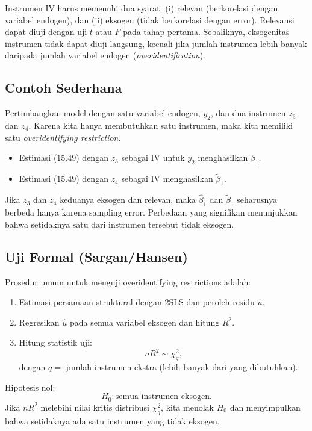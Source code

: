 \documentclass[]{article}
\begin{document}
Instrumen IV harus memenuhi dua syarat: (i) relevan (berkorelasi dengan variabel endogen), 
dan (ii) eksogen (tidak berkorelasi dengan error). Relevansi dapat diuji dengan uji $t$ atau $F$ 
pada tahap pertama. Sebaliknya, eksogenitas instrumen tidak dapat diuji langsung, 
kecuali jika jumlah instrumen lebih banyak daripada jumlah variabel endogen (\textit{overidentification}).

\subsection*{Contoh Sederhana}
Pertimbangkan model dengan satu variabel endogen, $y_2$, dan dua instrumen $z_3$ dan $z_4$.
Karena kita hanya membutuhkan satu instrumen, maka kita memiliki satu 
\textit{overidentifying restriction}. 

\begin{itemize}
    \item Estimasi (15.49) dengan $z_3$ sebagai IV untuk $y_2$ menghasilkan $\hat{\beta}_1$.
    \item Estimasi (15.49) dengan $z_4$ sebagai IV menghasilkan $\tilde{\beta}_1$.
\end{itemize}

Jika $z_3$ dan $z_4$ keduanya eksogen dan relevan, maka $\hat{\beta}_1$ dan $\tilde{\beta}_1$ 
seharusnya berbeda hanya karena sampling error. Perbedaan yang signifikan menunjukkan bahwa 
setidaknya satu dari instrumen tersebut tidak eksogen.

\subsection*{Uji Formal (Sargan/Hansen)}
Prosedur umum untuk menguji overidentifying restrictions adalah:
\begin{enumerate}
    \item Estimasi persamaan struktural dengan 2SLS dan peroleh residu $\hat{u}$.
    \item Regresikan $\hat{u}$ pada semua variabel eksogen dan hitung $R^2$.
    \item Hitung statistik uji:
    \[
    nR^2 \sim \chi^2_q,
    \]
    dengan $q =$ jumlah instrumen ekstra (lebih banyak dari yang dibutuhkan).
\end{enumerate}

Hipotesis nol:
\[
H_0: \text{semua instrumen eksogen.}
\]
Jika $nR^2$ melebihi nilai kritis distribusi $\chi^2_q$, kita menolak $H_0$ dan menyimpulkan 
bahwa setidaknya ada satu instrumen yang tidak eksogen.
\end{document}
